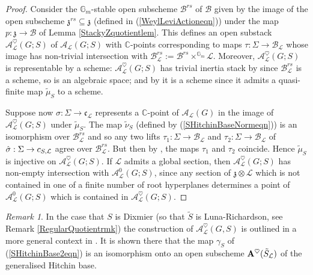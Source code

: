 \documentclass{amsart}
\theoremstyle{remark}
\newtheorem{remark}[theorem]{Remark}
\numberwithin{theorem}{section}
\numberwithin{equation}{section}
\begin{document}
\begin{proof}
Consider the $\mathbb{G}_m$-stable open subscheme $\mathcal B^{rs}$ of $\mathcal B$ given by the image of the open subscheme $\mathfrak{z}^{rs} \subseteq \mathfrak{z}$ (defined in (\ref{WeylLeviActioneqn})) under the map $p:\mathfrak{z}\rightarrow \mathcal B$ of Lemma \ref{StackyZquotientlem}. This defines an open substack $\mathcal A_{\mathcal L}^\heartsuit(G;S)$ of $\mathcal A_\mathcal L(G;S)$ with $\mathbb{C}$-points corresponding to maps $\tau:\Sigma \rightarrow \mathcal B_{\mathcal L}$ whose image has non-trivial intersection with $\mathcal B^{rs}_\mathcal L := \mathcal B^{rs} \times^{\mathbb{G}_m} \mathcal L$. Moreover, $\mathcal A_{\mathcal L}^\heartsuit(G;S)$ is representable by a scheme: $\mathcal A_{\mathcal L}^\heartsuit(G;S)$ has trivial inertia stack by \cite[Proposition A.1]{FMN} since $\mathcal B^{rs}_{\mathcal L}$ is a scheme, so is an algebraic space; and by \cite[Théorème A.2]{LMB} it is a scheme since it admits a quasi-finite map $\tilde{\mu}_S$ to a scheme.

Suppose now $\sigma:\Sigma \rightarrow \mathfrak{c}_\mathcal L$ represents a $\mathbb{C}$-point of $\mathcal A_\mathcal L(G)$ in the image of $\mathcal A_{\mathcal L}^\heartsuit(G;S)$ under $\tilde{\mu}_S$. The map $\tilde{\nu}_S$ (defined by (\ref{SHitchinBaseNormeqn})) is an isomorphism over $\mathcal B^{rs}_{\mathcal L}$ and so any two lifts $\tau_1:\Sigma \rightarrow \mathcal B_\mathcal L$ and $\tau_2:\Sigma \rightarrow \mathcal B_\mathcal L$ of $\hat{\sigma}:\Sigma \rightarrow \mathcal \mathfrak{c}_{S,\mathcal L}$ agree over $\mathcal B^{rs}_{\mathcal L}$. But then by \cite[Proposition A.1]{FMN}, the maps $\tau_1$ and $\tau_2$ coincide. Hence $\tilde{\mu}_S$ is injective on $\mathcal A_{\mathcal L}^\heartsuit(G;S)$. If $\mathcal L$ admits a global section, then $\mathcal A_{\mathcal L}^\heartsuit(G;S)$ has non-empty intersection with $\mathcal A^0_{\mathcal L}(G;S)$, since any section of $\mathfrak{z} \otimes \mathcal L$ which is not contained in one of a finite number of root hyperplanes determines a point of $\mathcal A^0_{\mathcal L}(G;S)$ which is contained in $\mathcal A_{\mathcal L}^\heartsuit(G;S)$.
\end{proof}

\begin{remark}\label{GenHFAheartrmk}
    In the case that $S$ is Dixmier (so that $\tilde{S}$ is Luna-Richardson, see Remark \ref{RegularQuotientrmk}) the construction of $\mathcal A^\heartsuit_\mathcal L(G,S)$ is outlined in a more general context in \cite[Section 4.3]{Ngo3}. It is shown there that the map $\gamma_S$ of (\ref{SHitchinBase2eqn}) is an isomorphism onto an open subscheme ${\bf A}^\heartsuit(\tilde{S}_\mathcal L)$ of the generalised Hitchin base.
\end{remark}
\end{document}
